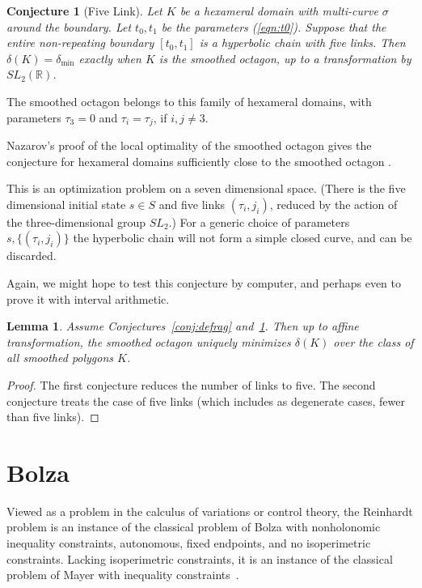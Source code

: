 \documentclass[11pt]{amsart}
\newtheorem{lemma}[equation]{Lemma}
\newtheorem{conj}[equation]{Conjecture}
\newcommand{\ring}[1]{\mathbb{#1}}
\def\deltalat{\mathbb\delta}  %
\def\delt{\delta_{\min}}
\def\rR{{\ring{R}}}
\def\ta{{\tau}}
\begin{document}
\begin{conj}[Five Link]\label{conj:5} 
Let $K$ be a hexameral domain with multi-curve $\sigma$ around the
boundary. 
Let $t_0,t_1$ be the parameters (\ref{eqn:t0}).  Suppose
that the entire non-repeating boundary $[t_0,t_1]$ is a hyperbolic chain with five
links.
Then $\deltalat(K)= \delt$ exactly when
$K$ is the smoothed octagon, up to 
a transformation by $SL_2(\rR)$.
\end{conj}

The smoothed octagon belongs to this family of hexameral
domains, with parameters $\ta_3=0$ and $\ta_i=\ta_j$, if $i,j\ne 3$.

Nazarov's proof of the local optimality of the smoothed octagon
gives the conjecture for hexameral domains sufficiently close
to the smoothed octagon \cite{N}.

This is an optimization problem on a seven dimensional space.
(There is the five dimensional initial state $s\in S$ and
five links $(\ta_i,j_i)$, reduced by the action of the three-dimensional
group $SL_2$.)  For a generic choice of parameters $s,\{(\ta_i,j_i)\}$
the hyperbolic chain will not form a simple closed curve, and can
be discarded.  

Again, we might hope to test this conjecture by computer, and perhaps
even to prove it with interval arithmetic.

\begin{lemma}\label{lemma:smooth}  Assume Conjectures~\ref{conj:defrag} and~\ref{conj:5}.
Then up to affine transformation, the smoothed octagon uniquely
minimizes $\deltalat(K)$ over the class of all smoothed polygons $K$.
\end{lemma}

\begin{proof} The first conjecture reduces the number of links to
  five.  The second conjecture treats the case of five links (which
  includes as degenerate cases, fewer than five links).
\end{proof}


\section{Bolza}


Viewed as a problem in the calculus of variations or control theory,
the Reinhardt problem is an instance of the classical
problem of Bolza with nonholonomic inequality constraints, autonomous,
fixed endpoints, and no isoperimetric constraints.  Lacking
isoperimetric constraints, it is an instance of the classical problem of Mayer with inequality
constraints~\cite[Ch.7]{He}. 
\end{document}
